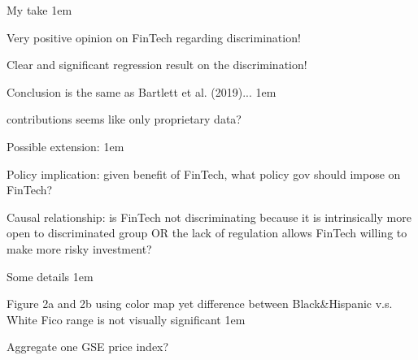 \documentclass[11pt,aspectratio=43,usenames,dvipsnames]{beamer}
\let\olditemize=\itemize
\let\endolditemize=\enditemize
\renewenvironment{itemize}{\olditemize \itemsep1em}{\endolditemize}
\theoremstyle{definition}
\begin{document}
\begin{frame}{My take}
\label{slide:My_opinion}
    \begin{itemize}
        \item Very positive opinion on FinTech regarding discrimination!
        \item Clear and significant regression result on the discrimination!
        \item Conclusion is the same as Bartlett et al. (2019)...
        \begin{itemize}
            \item contributions seems like only \alert{proprietary data}?
        \end{itemize}
        \item Possible extension:
        \begin{itemize}
            \item Policy implication: given benefit of FinTech, what policy gov should impose on FinTech?
            \item Causal relationship: is FinTech not discriminating because it is \alert{intrinsically more open} to discriminated group OR the \alert{lack of regulation} allows FinTech willing to make more risky investment?
        \end{itemize}

    \end{itemize}

\end{frame}


\begin{frame}{Some details}
\label{slide:Some_details}
    \begin{itemize}
        \item Figure 2a and 2b using color map yet difference between Black\&Hispanic v.s. White Fico range is not visually significant
        \begin{itemize}
            \item Aggregate one GSE price index?
        \end{itemize}
    \end{itemize}

\end{frame}
\end{document}
